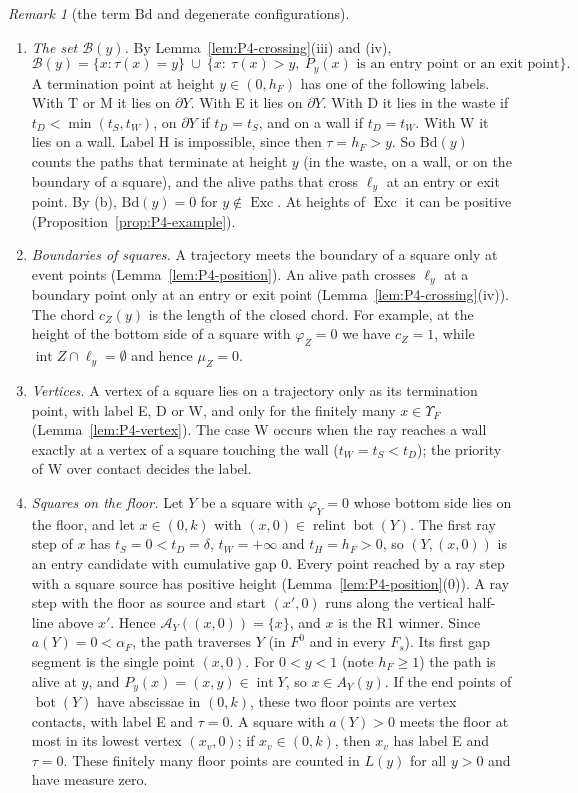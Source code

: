 \documentclass[11pt]{amsart}
\newcommand{\relint}{\operatorname{relint}}
\newcommand{\Bot}{\operatorname{bot}}
\newcommand{\Exc}{\operatorname{Exc}}
\newcommand{\Fz}{F^{0}}
\newcommand{\Fs}{F_{s}}
\theoremstyle{definition}
\theoremstyle{remark}
\newtheorem{remark}[theorem]{Remark}
\numberwithin{equation}{section}
\begin{document}
\begin{remark}[the term $\mathrm{Bd}$ and degenerate configurations]\label{rem:P4-Bd}
\leavevmode
\begin{enumerate}[(1)]
\item \emph{The set $\mathcal B(y)$.} By Lemma~\ref{lem:P4-crossing}(iii) and (iv),
\[
\mathcal B(y)=\{x:\tau(x)=y\}\ \cup\ \{x:\ \tau(x)>y,\ P_y(x)\text{ is an entry point or an exit point}\}.
\]
A termination point at height $y\in(0,h_F)$ has one of the following labels. With T or M it lies on $\partial Y$. With E it lies on $\partial Y$. With D it lies in the waste if $t_D<\min(t_S,t_W)$, on $\partial Y$ if $t_D=t_S$, and on a wall if $t_D=t_W$. With W it lies on a wall. Label H is impossible, since then $\tau=h_F>y$. So $\mathrm{Bd}(y)$ counts the paths that terminate at height $y$ (in the waste, on a wall, or on the boundary of a square), and the alive paths that cross $\ell_y$ at an entry or exit point. By (b), $\mathrm{Bd}(y)=0$ for $y\notin\Exc$. At heights of $\Exc$ it can be positive (Proposition~\ref{prop:P4-example}).
\item \emph{Boundaries of squares.} A trajectory meets the boundary of a square only at event points (Lemma~\ref{lem:P4-position}). An alive path crosses $\ell_y$ at a boundary point only at an entry or exit point (Lemma~\ref{lem:P4-crossing}(iv)). The chord $c_Z(y)$ is the length of the closed chord. For example, at the height of the bottom side of a square with $\varphi_Z=0$ we have $c_Z=1$, while $\operatorname{int}Z\cap\ell_y=\emptyset$ and hence $\mu_Z=0$.
\item \emph{Vertices.} A vertex of a square lies on a trajectory only as its termination point, with label E, D or W, and only for the finitely many $x\in\Upsilon_F$ (Lemma~\ref{lem:P4-vertex}). The case W occurs when the ray reaches a wall exactly at a vertex of a square touching the wall ($t_W=t_S<t_D$); the priority of W over contact decides the label.
\item \emph{Squares on the floor.} Let $Y$ be a square with $\varphi_Y=0$ whose bottom side lies on the floor, and let $x\in(0,k)$ with $(x,0)\in\relint\Bot(Y)$. The first ray step of $x$ has $t_S=0<t_D=\delta$, $t_W=+\infty$ and $t_H=h_F>0$, so $(Y,(x,0))$ is an entry candidate with cumulative gap $0$. Every point reached by a ray step with a square source has positive height (Lemma~\ref{lem:P4-position}(0)). A ray step with the floor as source and start $(x',0)$ runs along the vertical half-line above $x'$. Hence $\mathcal A_Y((x,0))=\{x\}$, and $x$ is the R1 winner. Since $a(Y)=0<\alpha_F$, the path traverses $Y$ (in $\Fz$ and in every $\Fs$). Its first gap segment is the single point $(x,0)$. For $0<y<1$ (note $h_F\ge1$) the path is alive at $y$, and $P_y(x)=(x,y)\in\operatorname{int}Y$, so $x\in A_Y(y)$. If the end points of $\Bot(Y)$ have abscissae in $(0,k)$, these two floor points are vertex contacts, with label E and $\tau=0$. A square with $a(Y)>0$ meets the floor at most in its lowest vertex $(x_v,0)$; if $x_v\in(0,k)$, then $x_v$ has label E and $\tau=0$. These finitely many floor points are counted in $L(y)$ for all $y>0$ and have measure zero.

\end{enumerate}
\end{remark}
\end{document}
